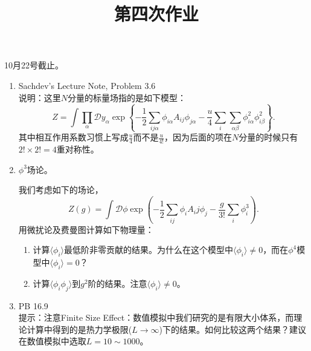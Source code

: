 \documentclass[12pt,aps,pra,notitlepage]{revtex4-1}
\begin{document}
\title{第四次作业}
\maketitle
\begin{center}
  10月22号截止。
\end{center}
\begin{enumerate}
  \item Sachdev's Lecture Note, Problem 3.6\\
  说明：这里$N$分量的标量场指的是如下模型：
  \[Z=\int\prod_{\alpha}\mathcal Dy_{\alpha}
  \exp\left\{-\frac12\sum_{ij\alpha}\phi_{i\alpha}A_{ij}\phi_{j\alpha}
  -\frac u{4}\sum_i\sum_{\alpha\beta}\phi_{i\alpha}^2\phi_{i\beta}^2
  \right\}.\]
  其中相互作用系数习惯上写成$\frac u4$而不是$\frac u{4!}$，因为后面的项在$N$分量的时候只有$2!\times2!=4$重对称性。
  \item $\phi^3$场论。

  我们考虑如下的场论，
  \[Z(g)=\int\mathcal D\phi \exp\left(
  -\frac12\sum_{ij}\phi_iA_ij\phi_j-\frac g{3!}\sum_i\phi_i^3\right).\]
  用微扰论及费曼图计算如下物理量：
  \begin{enumerate}
    \item 计算$\langle\phi_i\rangle$最低阶非零贡献的结果。为什么在这个模型中$\langle\phi_i\rangle\neq0$，而在$\phi^4$模型中$\langle\phi_i\rangle=0$？
    \item 计算$\langle\phi_i\phi_j\rangle$到$g^2$阶的结果。注意$\langle\phi_i\rangle\neq0$。
  \end{enumerate}
  \item PB 16.9\\
  提示：注意Finite Size Effect：数值模拟中我们研究的是有限大小体系，而理论计算中得到的是热力学极限($L\rightarrow\infty$)下的结果。如何比较这两个结果？建议在数值模拟中选取$L=10\sim1000$。
\end{enumerate}
\end{document}
